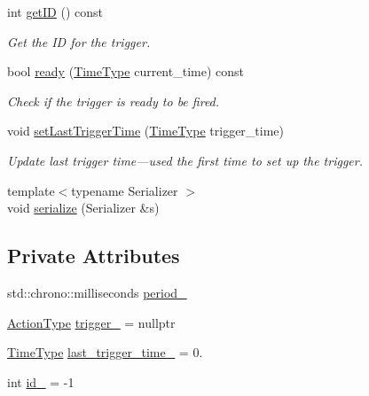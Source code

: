 \begin{DoxyCompactItemize}
int \hyperlink{structvt_1_1timetrigger_1_1_trigger_add9337af4c0c64a4d9903555d2d74835}{get\+ID} () const
\begin{DoxyCompactList}\small\item\em Get the ID for the trigger. \end{DoxyCompactList}\item 
bool \hyperlink{structvt_1_1timetrigger_1_1_trigger_af00027850254b42fbcc2f5fde829b386}{ready} (\hyperlink{namespacevt_a876a9d0cd5a952859c72de8a46881442}{Time\+Type} current\+\_\+time) const
\begin{DoxyCompactList}\small\item\em Check if the trigger is ready to be fired. \end{DoxyCompactList}\item 
void \hyperlink{structvt_1_1timetrigger_1_1_trigger_aae694885195a12a0bd7274859bfaa0ba}{set\+Last\+Trigger\+Time} (\hyperlink{namespacevt_a876a9d0cd5a952859c72de8a46881442}{Time\+Type} trigger\+\_\+time)
\begin{DoxyCompactList}\small\item\em Update last trigger time---used the first time to set up the trigger. \end{DoxyCompactList}\item 
{\footnotesize template$<$typename Serializer $>$ }\\void \hyperlink{structvt_1_1timetrigger_1_1_trigger_ab765fcb8e674543c4f1dd22aa97fdf6e}{serialize} (Serializer \&s)
\end{DoxyCompactItemize}
\subsection*{Private Attributes}
\begin{DoxyCompactItemize}
\item 
std\+::chrono\+::milliseconds \hyperlink{structvt_1_1timetrigger_1_1_trigger_aa95009a5d9a17ffdb84b5317a7a5dfc2}{period\+\_\+}
\item 
\hyperlink{namespacevt_ae0a5a7b18cc99d7b732cb4d44f46b0f3}{Action\+Type} \hyperlink{structvt_1_1timetrigger_1_1_trigger_ac1d93e6fff9b0faa8889198e481d50d4}{trigger\+\_\+} = nullptr
\item 
\hyperlink{namespacevt_a876a9d0cd5a952859c72de8a46881442}{Time\+Type} \hyperlink{structvt_1_1timetrigger_1_1_trigger_ac844f5940943ca203c90dd485d47a0c6}{last\+\_\+trigger\+\_\+time\+\_\+} = 0.
\item 
int \hyperlink{structvt_1_1timetrigger_1_1_trigger_a1a640c2311fa49ed0a7b79480dda4439}{id\+\_\+} = -\/1
\end{DoxyCompactItemize}
